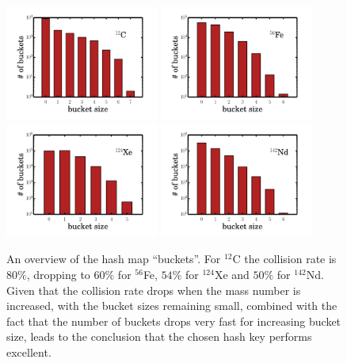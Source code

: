 \documentclass[10pt]{article}
\begin{document}
\begin{figure}
\centering
\includegraphics[width=0.45\textwidth]{figures/threej_map_buckets_12C.pdf}
\includegraphics[width=0.45\textwidth]{figures/threej_map_buckets_56Fe.pdf}
\includegraphics[width=0.45\textwidth]{figures/threej_map_buckets_124Xe.pdf}
\includegraphics[width=0.45\textwidth]{figures/threej_map_buckets_142Nd.pdf}
\caption{An overview of the hash map ``buckets''. For $^{12}$C the collision rate is $80\%$, dropping to $60\%$ for $^{56}$Fe, $54\%$ for $^{124}$Xe and $50\%$ for $^{142}$Nd. Given that the collision rate drops when the mass number is increased, with the bucket sizes remaining small, combined with the fact that the number of buckets drops very fast for increasing bucket size, leads to the conclusion that the chosen hash key performs excellent.}
\end{figure}
\end{document}
